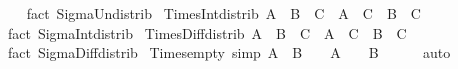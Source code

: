 \begin{isabellebody}
%
\isadelimproof
\ \ %
\endisadelimproof
%
\isatagproof
{}\isamarkupfalse%
\ {\isacharparenleft}{\kern0pt}fact\ Sigma{\isacharunderscore}{\kern0pt}Un{\isacharunderscore}{\kern0pt}distrib{}{\isacharparenright}{\kern0pt}%
\endisatagproof
{\isafoldproof}%
%
\isadelimproof
\isanewline
%
\endisadelimproof
\isanewline
{}\isamarkupfalse%
\ Times{\isacharunderscore}{\kern0pt}Int{\isacharunderscore}{\kern0pt}distrib{}{\isacharcolon}{\kern0pt}\ {\isachardoublequoteopen}{\isacharparenleft}{\kern0pt}A\ {\isasyminter}\ B{\isacharparenright}{\kern0pt}\ {\isasymtimes}\ C\ {\isacharequal}{\kern0pt}\ A\ {\isasymtimes}\ C\ {\isasyminter}\ B\ {\isasymtimes}\ C\ {\isachardoublequoteclose}\isanewline
%
\isadelimproof
\ \ %
\endisadelimproof
%
\isatagproof
{}\isamarkupfalse%
\ {\isacharparenleft}{\kern0pt}fact\ Sigma{\isacharunderscore}{\kern0pt}Int{\isacharunderscore}{\kern0pt}distrib{}{\isacharparenright}{\kern0pt}%
\endisatagproof
{\isafoldproof}%
%
\isadelimproof
\isanewline
%
\endisadelimproof
\isanewline
{}\isamarkupfalse%
\ Times{\isacharunderscore}{\kern0pt}Diff{\isacharunderscore}{\kern0pt}distrib{}{\isacharcolon}{\kern0pt}\ {\isachardoublequoteopen}{\isacharparenleft}{\kern0pt}A\ {\isacharminus}{\kern0pt}\ B{\isacharparenright}{\kern0pt}\ {\isasymtimes}\ C\ {\isacharequal}{\kern0pt}\ A\ {\isasymtimes}\ C\ {\isacharminus}{\kern0pt}\ B\ {\isasymtimes}\ C\ {\isachardoublequoteclose}\isanewline
%
\isadelimproof
\ \ %
\endisadelimproof
%
\isatagproof
{}\isamarkupfalse%
\ {\isacharparenleft}{\kern0pt}fact\ Sigma{\isacharunderscore}{\kern0pt}Diff{\isacharunderscore}{\kern0pt}distrib{}{\isacharparenright}{\kern0pt}%
\endisatagproof
{\isafoldproof}%
%
\isadelimproof
\isanewline
%
\endisadelimproof
\isanewline
{}\isamarkupfalse%
\ Times{\isacharunderscore}{\kern0pt}empty\ {\isacharbrackleft}{\kern0pt}simp{\isacharbrackright}{\kern0pt}{\isacharcolon}{\kern0pt}\ {\isachardoublequoteopen}A\ {\isasymtimes}\ B\ {\isacharequal}{\kern0pt}\ {\isacharbraceleft}{\kern0pt}{\isacharbraceright}{\kern0pt}\ {\isasymlongleftrightarrow}\ A\ {\isacharequal}{\kern0pt}\ {\isacharbraceleft}{\kern0pt}{\isacharbraceright}{\kern0pt}\ {\isasymor}\ B\ {\isacharequal}{\kern0pt}\ {\isacharbraceleft}{\kern0pt}{\isacharbraceright}{\kern0pt}{\isachardoublequoteclose}\isanewline
%
\isadelimproof
\ \ %
\endisadelimproof
%
\isatagproof
{}\isamarkupfalse%
\ auto%
\endisatagproof
{\isafoldproof}%
%
\isadelimproof
\isanewline
%
\endisadelimproof
\isanewline

\end{isabellebody}

